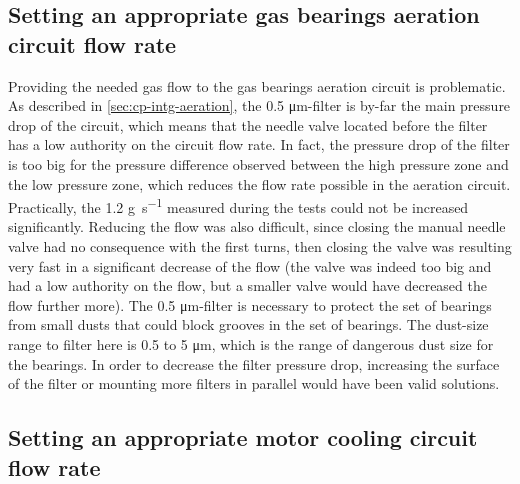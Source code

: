 \subsection{Setting an appropriate gas bearings
  aeration circuit flow rate}
\label{sec:awp-issue-bearings-aeration}

Providing the needed gas flow to the gas bearings aeration circuit is
problematic. As described in \cref{sec:cp-intg-aeration}, the 0.5
\si{\micro\meter}-filter is by-far the main pressure drop of the
circuit, which means that the needle valve located before the filter
has a low authority on the circuit flow rate. In fact, the pressure
drop of the filter is too big for the pressure difference observed
between the high pressure zone and the low pressure zone, which
reduces the flow rate possible in the aeration circuit. Practically,
the 1.2 \si{\gram\per\second} measured during the tests could not be
increased significantly. Reducing the flow was also difficult, since
closing the manual needle valve had no consequence with the first
turns, then closing the valve was resulting very fast in a significant
decrease of the flow (the valve was indeed too big and had a low
authority on the flow, but a smaller valve would have decreased the
flow further more). The 0.5 \si{\micro\meter}-filter is necessary to
protect the set of bearings from small dusts that could block grooves
in the set of bearings. The dust-size range to filter here is 0.5 to 5
\si{\micro\meter}, which is the range of dangerous dust size for the
bearings. In order to decrease the filter pressure drop, increasing
the surface of the filter or mounting more filters in parallel would
have been valid solutions.


\subsection{Setting an appropriate motor cooling circuit
  flow rate}
\label{sec:awp-issue-motor-cooling}


